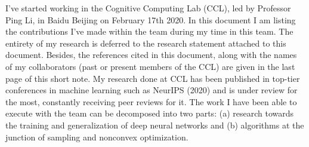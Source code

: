 \documentclass[twoside,11pt]{article}
\begin{document}
%
%
%
%
%
%
%


\textbf{\scalebox{2}{Baidu, Beijing}}  \hfill \textbf{\scalebox{1.5}{Belhal Karimi}} 


\hfill

I've started working in the Cognitive Computing Lab (CCL), led by Professor Ping Li, in Baidu Beijing on February 17th 2020.
In this document I am listing the contributions I've made within the team during my time in this team.
The entirety of my research is deferred to the research statement attached to this document.
Besides, the references cited in this document, along with the names of my collaborators (past or present members of the CCL) are given in the last page of this short note.
My research done at CCL has been published in top-tier conferences in machine learning such as NeurIPS (2020) and is under review for the most, constantly receiving peer reviews for it.
The work I have been able to execute with the team can be decomposed into two parts: (a) research towards the training and generalization of deep neural networks and (b) algorithms at the junction of sampling and nonconvex optimization.


\vspace{0.2in}
\textbf{\scalebox{1.6}{(a) Deep Learning: Training and Generalization}}
\vspace{0.2in}
\end{document}
